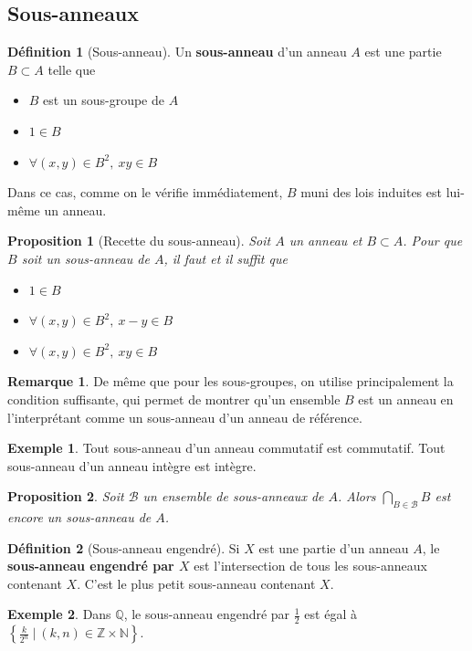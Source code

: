 \documentclass[french]{book}
\newcommand{\N}{\mathbb{N}}
\newcommand{\Z}{\mathbb{Z}}
\newcommand{\Q}{\mathbb{Q}}
\theoremstyle{plain}
\newtheorem{prop}{Proposition}[chapter]
\theoremstyle{definition}
\newtheorem{dfn}{Définition}[chapter]
\newtheorem{exa}{Exemple}[chapter]
\newtheorem{rmq}{Remarque}[chapter]
\theoremstyle{remark}
\begin{document}
\subsection{Sous-anneaux}
\begin{dfn}[Sous-anneau]
	Un \textbf{sous-anneau} d'un anneau $A$ est une partie $B\subset A$ telle que 
	\begin{itemize}
		\item $B$ est un sous-groupe de $A$
		\item $1\in B$
		\item $\forall(x,y)\in B^2,\ xy\in B$
	\end{itemize}
	Dans ce cas, comme on le vérifie immédiatement, $B$ muni des lois induites est lui-même un anneau.
\end{dfn}
\begin{prop}[Recette du sous-anneau]
	Soit $A$ un anneau et $B\subset A$. Pour que $B$ soit un sous-anneau de $A$, il faut et il suffit que \begin{itemize}
		\item $1\in B$
		\item $\forall(x,y)\in B^2,\ x-y\in B$
		\item $\forall(x,y)\in B^2,\ xy\in B$
	\end{itemize}
\end{prop}
\begin{rmq}
	De même que pour les sous-groupes, on utilise principalement la condition suffisante, qui permet de montrer qu'un ensemble $B$ est un anneau en l'interprétant comme un sous-anneau d'un anneau de référence.
\end{rmq}
\begin{exa}
	Tout sous-anneau d'un anneau commutatif est commutatif. Tout sous-anneau d'un anneau intègre est intègre.
\end{exa}
\begin{prop}
	Soit $\mathcal{B}$ un ensemble de sous-anneaux de $A$. Alors $\displaystyle \bigcap_{B\in\mathcal{B}}B$ est encore un sous-anneau de $A$.
\end{prop}
\begin{dfn}[Sous-anneau engendré]
	Si $X$ est une partie d'un anneau $A$, le \textbf{sous-anneau engendré par $X$} est l'intersection de tous les sous-anneaux contenant $X$. C'est le plus petit sous-anneau contenant $X$.
\end{dfn}
\begin{exa}
	Dans $\Q$, le sous-anneau engendré par $\displaystyle\frac12$ est égal à $\displaystyle\left\{\frac{k}{2^n}\ | \ (k,n)\in\Z\times\N\right\}$.
\end{exa}
\end{document}
